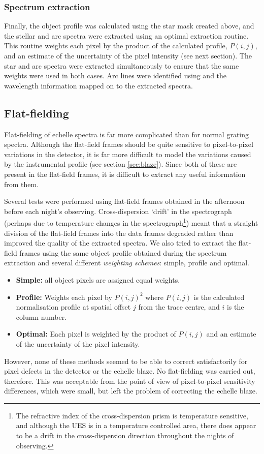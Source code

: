 \subsubsection{Spectrum extraction}
Finally, the object profile was calculated using the star mask created
above, and the stellar and arc spectra were extracted using an optimal
extraction routine. This routine weights each pixel by the product of
the calculated profile, $P(i,j)$, and an estimate of the uncertainty
of the pixel intensity (see next section). The star and arc spectra
were extracted simultaneously to ensure that the same weights were
used in both cases. Arc lines were identified using  and
the wavelength information mapped on to the extracted spectra.

\subsection{Flat-fielding}
\label{sec:flatfield}
Flat-fielding of echelle spectra is far more complicated than for
normal grating spectra. Although the flat-field frames should be quite
sensitive to pixel-to-pixel variations in the detector, it is far more
difficult to model the variations caused by the instrumental profile
(see section \ref{sec:blaze}). Since both of these are present in the
flat-field frames, it is difficult to extract any useful information
from them.

Several tests were performed using flat-field frames obtained in the
afternoon before each night's observing. Cross-dispersion `drift' in
the spectrograph (perhaps due to temperature changes in the
spectrograph\footnote{The refractive index of the cross-dispersion
prism is temperature sensitive, and although the UES is in a
temperature controlled area, there does appear to be a drift in the
cross-dispersion direction throughout the nights of observing.}) meant
that a straight division of the flat-field frames into the data frames
degraded rather than improved the quality of the extracted spectra. We
also tried to extract the flat-field frames using the same object
profile obtained during the spectrum extraction and several different
\emph{weighting schemes}: simple, profile and optimal.
\begin{itemize}
\item	\textbf{Simple:} all object pixels are assigned equal weights.
\item	\textbf{Profile:} Weights each pixel by $P(i,j)^2$ where $P(i,j)$ is
	the calculated normalisation profile at spatial offset $j$ from the
	trace centre, and $i$ is the column number.
\item 	\textbf{Optimal:} Each pixel is weighted by the product of $P(i,j)$
	and an estimate of the uncertainty of the pixel intensity.
\end{itemize}
However, none of these methods seemed to be able to correct
satisfactorily for pixel defects in the detector or the echelle
blaze. No flat-fielding was carried out, therefore. This was
acceptable from the point of view of pixel-to-pixel sensitivity
differences, which were small, but left the problem of correcting the
echelle blaze.

